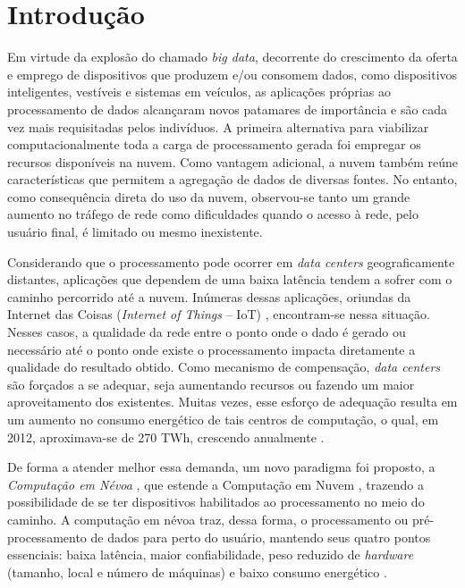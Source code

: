 \documentclass[12pt,english,brazil]{article}
\begin{document}
\section{Introdução}
Em virtude da explosão do chamado \textit{big data}, decorrente do crescimento da oferta e emprego de dispositivos que produzem e/ou consomem dados, como dispositivos inteligentes, vestíveis e sistemas em veículos, as aplicações próprias ao processamento de dados alcançaram novos patamares de importância e são cada vez mais requisitadas pelos indivíduos. A primeira alternativa para viabilizar computacionalmente toda a carga de processamento gerada foi empregar os recursos disponíveis na nuvem. Como vantagem adicional, a nuvem também reúne características que permitem a agregação de dados de diversas fontes. No entanto, como consequência direta do uso da nuvem, observou-se tanto um grande aumento no tráfego de rede como dificuldades quando o acesso à rede, pelo usuário final, é limitado ou mesmo inexistente.

Considerando que o processamento pode ocorrer em \textit{data centers} geograficamente distantes, aplicações que dependem de uma baixa latência tendem a sofrer com o caminho percorrido até a nuvem. Inúmeras dessas aplicações, oriundas da Internet das Coisas (\textit{Internet of Things} -- IoT) \cite{gubbi2013internet}, encontram-se nessa situação. Nesses casos, a qualidade da rede entre o ponto onde o dado é gerado ou necessário até o ponto onde existe o processamento impacta diretamente a qualidade do resultado obtido. Como mecanismo de compensação, \textit{data centers} são forçados a se adequar, seja aumentando recursos ou fazendo um maior aproveitamento dos existentes. Muitas vezes, esse esforço de adequação resulta em um aumento no consumo energético de tais centros de computação, o qual, em 2012, aproximava-se de 270 TWh, crescendo anualmente \cite{VanHeddeghem:2014:TWI:2657027.2657141}.

De forma a atender melhor essa demanda, um novo paradigma foi proposto, a \emph{Computação em Névoa} \cite{Bonomi:2012:FCR:2342509.2342513}, que estende a Computação em Nuvem \cite{mell2011nist}, trazendo a possibilidade de se ter dispositivos habilitados ao processamento no meio do caminho. A computação em névoa traz, dessa forma, o processamento ou pré-processamento de dados para perto do usuário, mantendo seus quatro pontos essenciais: baixa latência, maior confiabilidade, peso reduzido de \textit{hardware} (tamanho, local e número de máquinas) e baixo consumo energético \cite{caracteristicas}.
\end{document}
